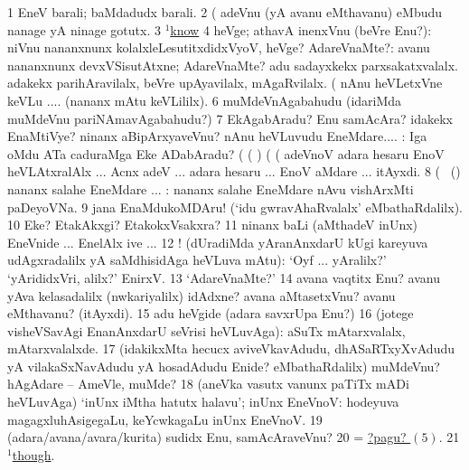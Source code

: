 \noindent 
\gl{\pagu}
\expl{}
\bmng
\bnum
\num{1}  EneV barali; baMdadudx barali. 
\num{2}  (    adeVnu (yA avanu eMthavanu) eMbudu nanage yA ninage gotutx. 
\num{3} \hyperref{kandict_k.pdf}{K}{know(1) nuga(28)}{$^1$know}  
\num{4}   heVge; athavA inenxVnu (beVre Enu?):  niVnu nananxnunx kolalxleLesutitxdidxVyoV, heVge? 
  
\banum
{} AdareVnaMte?:  avanu nananxnunx devxVSisutAtxne; AdareVnaMte? adu sadayxkekx parxsakatxvalalx. 
 adakekx parihAravilalx, beVre upAyavilalx, mAgaRvilalx.  (  nAnu heVLetxVne keVLu .... (nananx mAtu keVLililx). 
\eanum
\numie
\num{6}  muMdeVnAgabahudu (idariMda muMdeVnu pariNAmavAgabahudu?) 
\num{7}  EkAgabAradu? Enu samAcAra? idakekx EnaMtiVye? ninanx aBipArxyaveVnu? nAnu heVLuvudu EneMdare.... :  Iga oMdu ATa caduraMga Eke ADabAradu?  (  ( ) (  (  adeVnoV adara hesaru EnoV heVLAtxralAlx ... Acnx adeV ... adara hesaru ... EnoV aMdare ... itAyxdi. 
\num{8}  (\ame\  (\AmA) nananx salahe EneMdare ... :  nananx salahe EneMdare nAvu vishArxMti paDeyoVNa. 
\num{9}  jana EnaMdukoMDAru! (`idu gwravAhaRvalalx' eMbathaRdalilx). 
\num{10}  Eke? EtakAkxgi? EtakokxVsakxra? 
\num{11}  ninanx baLi (aMthadeV inUnx) EneVnide ... EnelAlx ive ... 
\num{12} ! (dUradiMda yAranAnxdarU kUgi kareyuva udAgxradalilx yA saMdhisidAga heVLuva mAtu): `Oyf ... yAralilx?' `yArididxVri, alilx?' EnirxV. 
\num{13}  `AdareVnaMte?' 
\num{14}  avana vaqtitx Enu? avanu yAva kelasadalilx (nwkariyalilx) idAdxne? avana aMtasetxVnu? avanu eMthavanu? (itAyxdi). 
\num{15}  adu heVgide (adara savxrUpa Enu?) 
\num{16}  (jotege visheVSavAgi EnanAnxdarU seVrisi heVLuvAga): aSuTx mAtarxvalalx, mAtarxvalalxde. 
\num{17}  (idakikxMta hecucx aviveVkavAdudu, dhASaRTxyXvAdudu yA vilakaSxNavAdudu yA hosadAdudu Enide? eMbathaRdalilx) muMdeVnu? hAgAdare -- AmeVle, muMde? 
\num{18}  (aneVka vasutx \mo vanunx paTiTx mADi heVLuvAga) `inUnx iMtha hatutx halavu'; inUnx EneVnoV:  hodeyuva magagxluhAsigegaLu, keYcwkagaLu inUnx EneVnoV. 
\num{19}  (adara/avana/avara/kurita) sudidx Enu, samAcAraveVnu? 
\num{20}  = \hyperlink{what2 pagu5}{?pagu? \((5)\)}. 
\num{21}  \hyperref{kandict_t.pdf}{T}{though(1) pagu(2)}{$^1$though}. 
\enum
\emng
\eentry

